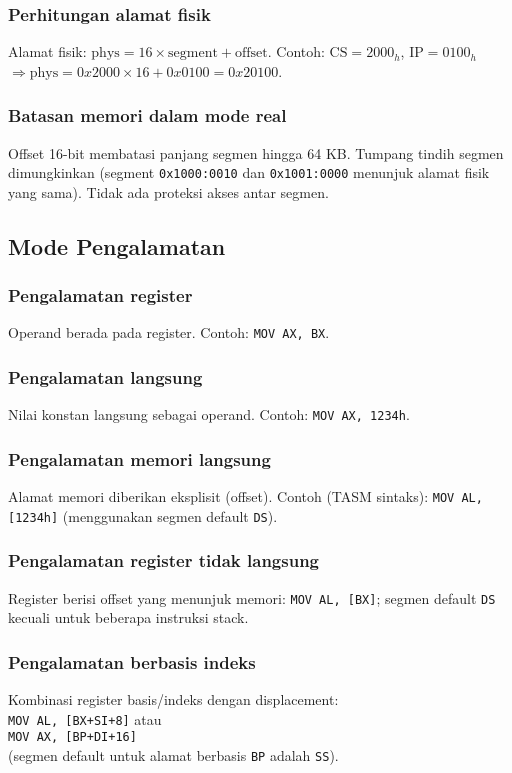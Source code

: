 \subsubsection{Perhitungan alamat fisik}
Alamat fisik: \(\text{phys} = 16 \times \text{segment} + \text{offset}\). Contoh: \(\text{CS} = 2000_h\), \(\text{IP} = 0100_h\) \(\Rightarrow \text{phys} = 0x2000\times 16 + 0x0100 = 0x20100\).

\subsubsection{Batasan memori dalam mode real}
Offset 16-bit membatasi panjang segmen hingga 64 KB. Tumpang tindih segmen dimungkinkan (segment \texttt{0x1000:0010} dan \texttt{0x1001:0000} menunjuk alamat fisik yang sama). Tidak ada proteksi akses antar segmen.

\subsection{Mode Pengalamatan}
\subsubsection{Pengalamatan register}
Operand berada pada register. Contoh: \texttt{MOV AX, BX}.

\subsubsection{Pengalamatan langsung}
Nilai konstan langsung sebagai operand. Contoh: \texttt{MOV AX, 1234h}.

\subsubsection{Pengalamatan memori langsung}
Alamat memori diberikan eksplisit (offset). Contoh (TASM sintaks): \texttt{MOV AL, [1234h]} (menggunakan segmen default \texttt{DS}).

\subsubsection{Pengalamatan register tidak langsung}
Register berisi offset yang menunjuk memori: \texttt{MOV AL, [BX]}; segmen default \texttt{DS} kecuali untuk beberapa instruksi stack.

\subsubsection{Pengalamatan berbasis indeks}
Kombinasi register basis/indeks dengan displacement: \\
\texttt{MOV AL, [BX+SI+8]} atau \\
\texttt{MOV AX, [BP+DI+16]} \\
(segmen default untuk alamat berbasis \texttt{BP} adalah \texttt{SS}).

